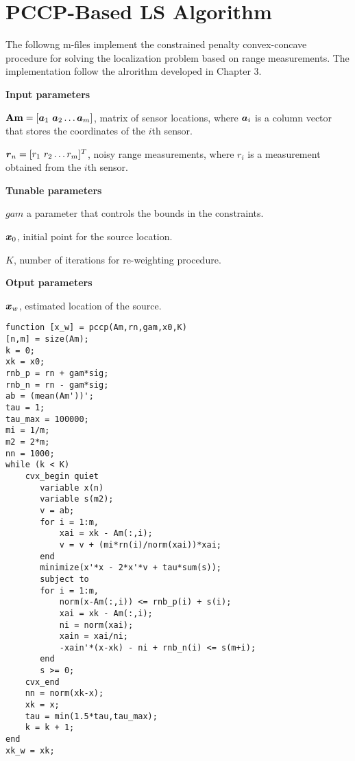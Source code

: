 \section{PCCP-Based LS Algorithm}

The followng m-files implement the constrained penalty convex-concave procedure for solving the localization problem based on range measurements. The implementation follow the alrorithm developed in Chapter 3.

\phantom{m}

\noindent
\textbf{Input parameters}

\noindent
$\mbox{\textbf{Am}} = [\mbox{\boldmath$a$}_1 \ \mbox{\boldmath$a$}_2 \ldots \mbox{\boldmath$a$}_m]$, matrix of sensor locations, where $\mbox{\boldmath$a$}_i$ is a column vector that stores the coordinates of the $i$th sensor.

\noindent
$\mbox{\boldmath$r$}_n = [r_1 \ r_2 \ldots r_m]^T$, noisy range measurements, where $r_i$ is a measurement obtained from the $i$th sensor.

\noindent
\textbf{Tunable parameters}

\noindent
$gam$ a parameter that controls the bounds in the constraints.

\noindent
$\mbox{\boldmath$x$}_0$, initial point for the source location.

\noindent
$K$, number of iterations for re-weighting procedure.

\noindent
\textbf{Otput parameters}

\noindent
$\mbox{\boldmath$x$}_w$, estimated location of the source.

\phantom{m}

\begin{lstlisting}
function [x_w] = pccp(Am,rn,gam,x0,K)
[n,m] = size(Am);
k = 0;
xk = x0;
rnb_p = rn + gam*sig;
rnb_n = rn - gam*sig;
ab = (mean(Am'))';
tau = 1;
tau_max = 100000;
mi = 1/m;
m2 = 2*m;
nn = 1000;
while (k < K) 
    cvx_begin quiet
       variable x(n)
       variable s(m2);
       v = ab;
       for i = 1:m,
           xai = xk - Am(:,i);
           v = v + (mi*rn(i)/norm(xai))*xai;
       end
       minimize(x'*x - 2*x'*v + tau*sum(s));
       subject to
       for i = 1:m,
           norm(x-Am(:,i)) <= rnb_p(i) + s(i);
           xai = xk - Am(:,i);
           ni = norm(xai);
           xain = xai/ni;
           -xain'*(x-xk) - ni + rnb_n(i) <= s(m+i);
       end
       s >= 0;
    cvx_end
    nn = norm(xk-x);
    xk = x;
    tau = min(1.5*tau,tau_max);
    k = k + 1;
end
xk_w = xk;
\end{lstlisting}

\newpage

